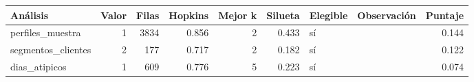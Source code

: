 \begin{tabular}{lrrrrrl>{\raggedright\arraybackslash}p{1.9cm}r}
\toprule
Análisis & Valor & Filas & Hopkins & Mejor k & Silueta & Elegible & Observación & Puntaje \\
\midrule
perfiles\_muestra & 1 & 3834 & 0.856 & 2 & 0.433 & sí &  & 0.144 \\
segmentos\_clientes & 2 & 177 & 0.717 & 2 & 0.182 & sí &  & 0.122 \\
dias\_atipicos & 1 & 609 & 0.776 & 5 & 0.223 & sí &  & 0.074 \\
\bottomrule
\end{tabular}
